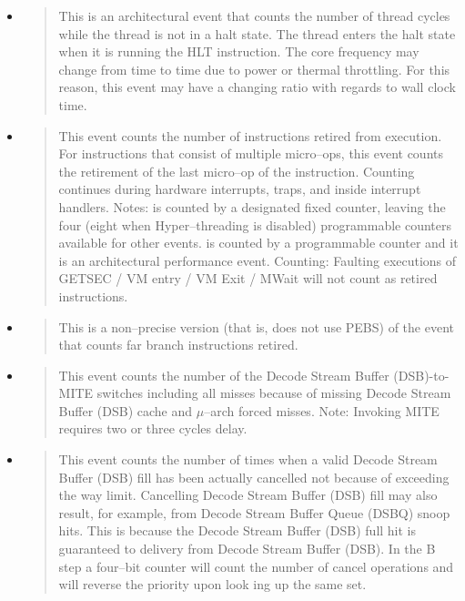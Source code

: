 \begin{itemize}

\item {}
\begin{quotation}
This is an architectural event that counts the number of thread cycles while the
thread is not in a halt state. The thread enters the halt state when it is
running the HLT instruction. The core frequency may change from time to time due
to power or thermal throttling. For this reason, this event may have a changing
ratio with regards to wall clock time.
\end{quotation}

\item {}
\begin{quotation}

This event counts the number of instructions retired from execution. For
instructions that consist of multiple micro--ops, this event counts the
retirement of the last micro--op of the instruction. Counting continues during
hardware interrupts, traps, and inside interrupt handlers. Notes:
 is counted by a designated fixed counter, leaving
the four (eight when Hyper--threading is disabled) programmable counters
available for other events.  is counted by
a programmable counter and it is an architectural performance event. Counting:
Faulting executions of GETSEC / VM entry / VM Exit / MWait will not count as
retired instructions.

\end{quotation}

\item {}
\begin{quotation}
This is a non--precise version (that is, does not use PEBS) of the event that
counts far branch instructions retired.
\end{quotation}

\item {} \begin{quotation} This event counts the
number of the Decode Stream Buffer (DSB)-\-to-\-MITE swit\-ches including all
misses because of missing Decode Stream Buffer (DSB) cache and $\mu$--arch
forced misses. Note: Invoking MITE requires two or three cycles delay.
\end{quotation}

\item {}
\begin{quotation}
This event counts the number of times when a valid Decode Stream Buffer (DSB)
fill has been actually cancelled not because of exceeding the way limit.
Cancelling Decode Stream Buffer (DSB) fill may also result, for example, from
Decode Stream Buffer Queue (DSBQ) snoop hits. This is because the Decode Stream
Buffer (DSB) full hit is guaranteed to delivery from Decode Stream Buffer (DSB).
In the B step a four--bit counter will count the number of cancel operations and
will reverse the priority upon look ing up the same set.
\end{quotation}


\end{itemize}
